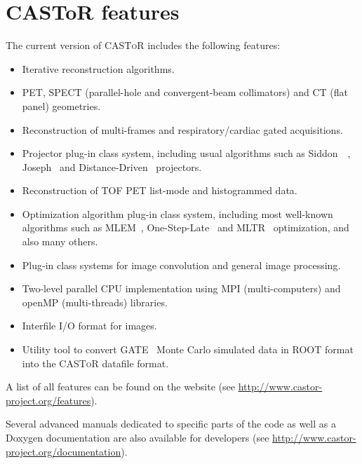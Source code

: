 \documentclass[a4paper, 11pt]{article}
\newcommand{\castor}{\textsc{CASToR}\xspace}
\begin{document}
\section{CASToR features}
\label{s_features}

The current version of \castor includes the following features:

\begin{itemize}
  \item Iterative reconstruction algorithms.
  \item PET, SPECT (parallel-hole and convergent-beam collimators) and CT (flat panel) geometries.
  \item Reconstruction of multi-frames and respiratory/cardiac gated acquisitions.
  \item Projector plug-in class system, including usual algorithms such as Siddon~\cite{Siddon}~\cite{FastSiddon}, Joseph~\cite{Joseph} and Distance-Driven~\cite{DistanceDriven} projectors.
  \item Reconstruction of TOF PET list-mode and histogrammed data.
  \item Optimization algorithm plug-in class system, including most well-known algorithms such as MLEM~\cite{MLEM}, One-Step-Late~\cite{OSL} and MLTR~\cite{MLTR} optimization, and also many others.
  \item Plug-in class systems for image convolution and general image processing.
  \item Two-level parallel CPU implementation using MPI (multi-computers) and openMP (multi-threads) libraries.
  \item Interfile I/O format for images.
  \item Utility tool to convert GATE~\cite{GATE} Monte Carlo simulated data in ROOT format~\cite{ROOT} into the \castor datafile format.
\end{itemize}

A list of all features can be found on the website (see \url{http://www.castor-project.org/features}).

Several advanced manuals dedicated to specific parts of the code as well as a Doxygen documentation are also available for developers (see \url{http://www.castor-project.org/documentation}).


\newpage
\end{document}
